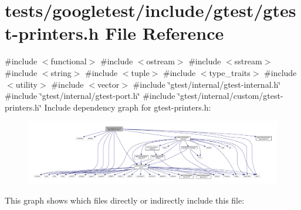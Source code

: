 \hypertarget{gtest-printers_8h}{}\section{tests/googletest/include/gtest/gtest-\/printers.h File Reference}
\label{gtest-printers_8h}
{\ttfamily \#include $<$functional$>$}\newline
{\ttfamily \#include $<$ostream$>$}\newline
{\ttfamily \#include $<$sstream$>$}\newline
{\ttfamily \#include $<$string$>$}\newline
{\ttfamily \#include $<$tuple$>$}\newline
{\ttfamily \#include $<$type\+\_\+traits$>$}\newline
{\ttfamily \#include $<$utility$>$}\newline
{\ttfamily \#include $<$vector$>$}\newline
{\ttfamily \#include \char`\"{}gtest/internal/gtest-\/internal.\+h\char`\"{}}\newline
{\ttfamily \#include \char`\"{}gtest/internal/gtest-\/port.\+h\char`\"{}}\newline
{\ttfamily \#include \char`\"{}gtest/internal/custom/gtest-\/printers.\+h\char`\"{}}\newline
Include dependency graph for gtest-\/printers.h\+:\nopagebreak
\begin{figure}[H]
\begin{center}
\leavevmode
\includegraphics[width=350pt]{gtest-printers_8h__incl}
\end{center}
\end{figure}
This graph shows which files directly or indirectly include this file\+:\nopagebreak
